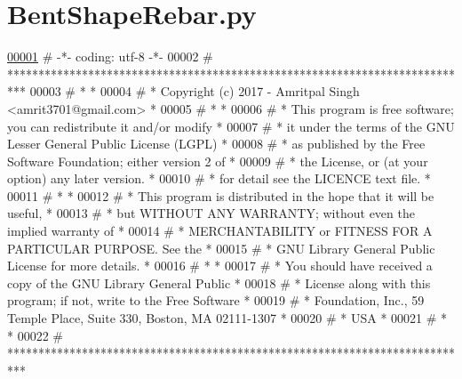 \hypertarget{BentShapeRebar_8py_source}{}\section{Bent\+Shape\+Rebar.\+py}

\begin{DoxyCode}
\hypertarget{BentShapeRebar_8py_source.tex_l00001}{}\hyperlink{namespaceBentShapeRebar}{00001} \textcolor{comment}{# -*- coding: utf-8 -*-}
00002 \textcolor{comment}{# ***************************************************************************}
00003 \textcolor{comment}{# *                                                                         *}
00004 \textcolor{comment}{# *   Copyright (c) 2017 - Amritpal Singh <amrit3701@gmail.com>             *}
00005 \textcolor{comment}{# *                                                                         *}
00006 \textcolor{comment}{# *   This program is free software; you can redistribute it and/or modify  *}
00007 \textcolor{comment}{# *   it under the terms of the GNU Lesser General Public License (LGPL)    *}
00008 \textcolor{comment}{# *   as published by the Free Software Foundation; either version 2 of     *}
00009 \textcolor{comment}{# *   the License, or (at your option) any later version.                   *}
00010 \textcolor{comment}{# *   for detail see the LICENCE text file.                                 *}
00011 \textcolor{comment}{# *                                                                         *}
00012 \textcolor{comment}{# *   This program is distributed in the hope that it will be useful,       *}
00013 \textcolor{comment}{# *   but WITHOUT ANY WARRANTY; without even the implied warranty of        *}
00014 \textcolor{comment}{# *   MERCHANTABILITY or FITNESS FOR A PARTICULAR PURPOSE.  See the         *}
00015 \textcolor{comment}{# *   GNU Library General Public License for more details.                  *}
00016 \textcolor{comment}{# *                                                                         *}
00017 \textcolor{comment}{# *   You should have received a copy of the GNU Library General Public     *}
00018 \textcolor{comment}{# *   License along with this program; if not, write to the Free Software   *}
00019 \textcolor{comment}{# *   Foundation, Inc., 59 Temple Place, Suite 330, Boston, MA  02111-1307  *}
00020 \textcolor{comment}{# *   USA                                                                   *}
00021 \textcolor{comment}{# *                                                                         *}
00022 \textcolor{comment}{# ***************************************************************************}

\end{DoxyCode}
